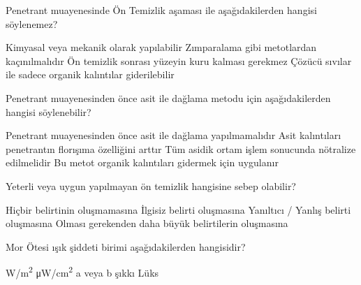 \begin{question}[subtitle=]
Penetrant muayenesinde Ön Temizlik aşaması ile aşağıdakilerden hangisi söylenemez?
	\begin{tasks}
          \task Kimyasal veya mekanik olarak yapılabilir 
          \task Zımparalama gibi metotlardan kaçınılmalıdır 
          \task Ön temizlik sonrası yüzeyin kuru kalması gerekmez \correct
          \task Çözücü sıvılar ile sadece organik kalıntılar giderilebilir
	\end{tasks}
\end{question}
\begin{solution}
	\correct
\end{solution}

\begin{question}[subtitle=]
Penetrant muayenesinden önce asit ile dağlama metodu için aşağıdakilerden hangisi söylenebilir?
	\begin{tasks}
          \task Penetrant muayenesinden önce asit ile dağlama yapılmamalıdır 
          \task Asit kalıntıları penetrantın florışıma özelliğini arttır 
          \task Tüm asidik ortam işlem sonucunda nötralize edilmelidir \correct
          \task Bu metot organik kalıntıları gidermek için uygulanır
	\end{tasks}
\end{question}
\begin{solution}
	\correct
\end{solution}

\begin{question}[subtitle=]
Yeterli veya uygun yapılmayan ön temizlik hangisine sebep olabilir?
	\begin{tasks}
          \task Hiçbir belirtinin oluşmamasına 
          \task İlgisiz belirti oluşmasına 
          \task Yanıltıcı / Yanlış belirti oluşmasına \correct
          \task Olması gerekenden daha büyük belirtilerin oluşmasına
	\end{tasks}
\end{question}
\begin{solution}
	\correct
\end{solution}

\begin{question}[subtitle=]
Mor Ötesi ışık şiddeti birimi aşağıdakilerden hangisidir?
	\begin{tasks}
          \task \si[per-mode=symbol]{\watt\per\m^{2}} 
          \task \si[per-mode=symbol]{\micro\watt\per\centi\m^{2}}
          \task a veya b şıkkı \correct
          \task Lüks
	\end{tasks}
\end{question}
\begin{solution}
	\correct
\end{solution}

